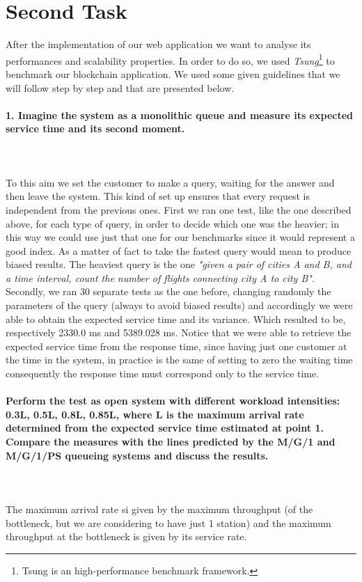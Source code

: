 \documentclass[11pt]{scrartcl} %
\begin{document}
\section{Second Task}

After the implementation of our web application we want to analyse its performances and scalability properties. In order to do so, we used \textit{Tsung}\footnote{Tsung is an high-performance benchmark framework.} to benchmark our blockchain application. We used some given guidelines that we will follow step by step and that are presented below.

\paragraph*{1. Imagine the system as a monolithic queue and measure its expected service time and its second moment.} \mbox{}\\\\ To this aim we set the customer to make a query, waiting for the answer and then leave the system. This kind of set up ensures that every request is independent from the previous ones. First we ran one test, like the one described above, for  each type of query, in order to decide which one was the heavier; in this way we could use just that one for our benchmarks since it would represent a good index. As a matter of fact to take the fastest query would mean to produce biased results. The heaviest query is the one \textit{"given a pair of cities A and B, and a time interval, count the number of flights connecting city A to city B"}.\\

Secondly, we ran 30 separate tests as the one before, changing randomly the parameters of the query (always to avoid biased results) and accordingly we were able to obtain the expected service time and its variance. Which resulted to be, respectively 2330.0 ms and 5389.028 ms.
Notice that we were able to retrieve the expected service time from the response time, since having just one customer at the time in the system, in practice is the same of setting to zero the waiting time consequently the response time must correspond only to the service time. 

\paragraph*{Perform the test as open system with different workload intensities: 0.3L, 0.5L, 0.8L, 0.85L, where L is the maximum arrival rate determined from the expected service time estimated at point 1. Compare the measures with the lines predicted by the M/G/1 and M/G/1/PS queueing systems and discuss the results.} \mbox{}\\\\ The maximum arrival rate si given by the maximum  throughput (of the bottleneck, but we are considering to have just 1 station) and the maximum throughput at the bottleneck is given by its service rate.
\end{document}
